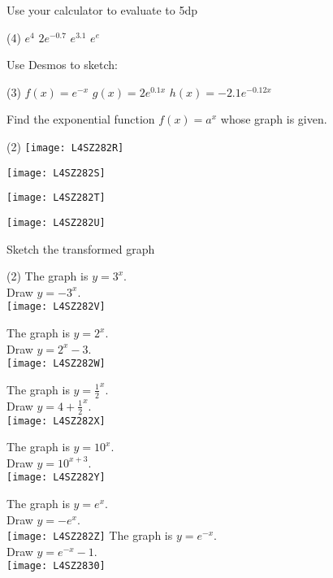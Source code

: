 \begin{Exercise}[title={$e^x$ functions},label=exExpFunctions]
	\Question Use your calculator to evaluate to 5dp 
	\begin{tasks}(4)
	\task $e^{4}$ %
\task $2 e^{ -0.7}$ %
\task $e^{3.1}$ %
\task $e^{e}$ %
	\end{tasks}

\Question Use Desmos to sketch: 
\begin{tasks}(3)
\task $f (x) =e^{ -x}$ 
\task $g (x) =2 e^{0.1 x}$ 
\task $h (x) = -2.1 e^{ -0.12 x}$
\end{tasks}

\Question Find the exponential function $f (x) =a^{x}$ whose graph is given. 
\begin{tasks}(2)
	\task %
	\texttt{[image: L4SZ282R]}
	
	\task 	%
	\texttt{[image: L4SZ282S]}
	
	\task 	%
	\texttt{[image: L4SZ282T]}
	
	\task 	%
	\texttt{[image: L4SZ282U]}\\
\end{tasks}

\clearpage
\Question Sketch the transformed graph
\begin{tasks}(2)
	\task The graph is $y =3^x$. \\Draw $y = -3^{x}$.\\ %
	\texttt{[image: L4SZ282V]}
	
	\task The graph is $y =2^x$. \\Draw $y =2^{x} -3$.\\%
	\texttt{[image: L4SZ282W]}
	
	\task The graph is $y =\frac{1}{2}^{x}$. \\Draw $y =4 +\frac{1}{2}^{x}$.\\%
	\texttt{[image: L4SZ282X]}
	
	\task The graph is $y =10^{x}$. \\Draw $y =10^{x +3}$.\\%
	\texttt{[image: L4SZ282Y]}
	
	\task The graph is $y =e^{x}$. \\Draw $y = -e^{x}$.\\ %
	\texttt{[image: L4SZ282Z]}
	\task The graph is $y =e^{ -x}$. \\Draw $y =e^{ -x} -1$.\\%
\texttt{[image: L4SZ2830]}\\
\end{tasks}
\end{Exercise}
